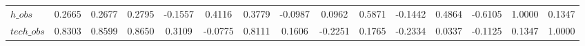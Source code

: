 \begin{center}
\begin{longtable}{lcccccccccccccc}
$h\_obs         $	 & 	           0.2665	 & 	           0.2677	 & 	           0.2795	 & 	          -0.1557	 & 	           0.4116	 & 	           0.3779	 & 	          -0.0987	 & 	           0.0962	 & 	           0.5871	 & 	          -0.1442	 & 	           0.4864	 & 	          -0.6105	 & 	           1.0000	 & 	           0.1347 \\ 
$tech\_obs      $	 & 	           0.8303	 & 	           0.8599	 & 	           0.8650	 & 	           0.3109	 & 	          -0.0775	 & 	           0.8111	 & 	           0.1606	 & 	          -0.2251	 & 	           0.1765	 & 	          -0.2334	 & 	           0.0337	 & 	          -0.1125	 & 	           0.1347	 & 	           1.0000 \\ 
\end{longtable}
 \end{center}

